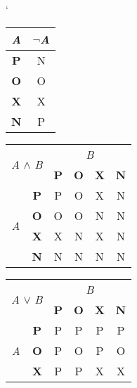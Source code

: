 \documentclass[a4paper,11pt, hidelinks]{article}
\begin{document}
\begin{table}[h]
\catcode`
\centering
\begin{subtable}[h]{0.085\textwidth}
    \centering
    \begin{tabular}{|c|c|}
        \hline
        \textit{A} & $\neg$\textit{A} \\
        \hline
        \textbf{P} & N \\
        \hline
        \textbf{O} & O \\
        \hline
        \textbf{X} & X \\
        \hline
        \textbf{N} & P \\
        \hline
    \end{tabular}
\end{subtable}
\;
\begin{subtable}{0.235\textwidth}
    \centering
    \begin{tabular}{|c|c|c|c|c|c|}
        \hline
        \multicolumn{2}{|c|}{\multirow{2}{*}{\textit{A} $\land$ \textit{B}}} & \multicolumn{4}{|c|}{\textit{B}} \\
        \cline{3-6}
        \multicolumn{2}{|c|}{} &\textbf{P} & \textbf{O} & \textbf{X} & \textbf{N} \\
        \hline
        \multirow{4}{*}{\textit{A}} & \textbf{P} & P & O & X & N \\
        \cline{2-6}
        & \textbf{O} & O & O & N & N \\
        \cline{2-6}
        & \textbf{X} & X & N & X & N \\
        \cline{2-6}
        & \textbf{N} & N & N & N & N \\
        \hline 
    \end{tabular}
\end{subtable}
\;
\begin{subtable}{0.235\textwidth}
    \centering
    \begin{tabular}{|c|c|c|c|c|c|}
        \hline
        \multicolumn{2}{|c|}{\multirow{2}{*}{\textit{A} $\lor$ \textit{B}}} & \multicolumn{4}{|c|}{\textit{B}} \\
        \cline{3-6}
        \multicolumn{2}{|c|}{} &\textbf{P} & \textbf{O} & \textbf{X} & \textbf{N} \\
        \hline
        \multirow{4}{*}{\textit{A}} & \textbf{P} & P & P & P & P \\
        \cline{2-6}
        & \textbf{O} & P & O & P & O \\
        \cline{2-6}
        & \textbf{X} & P & P & X & X \\

\end{tabular}
\end{subtable}
\end{table}
\end{document}
